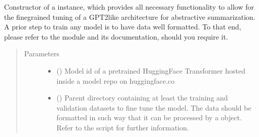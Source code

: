 \documentclass[letterpaper,10pt,english]{sphinxmanual}
\begin{document}
\begin{fulllineitems}
\begin{fulllineitems}
\label{\detokenize{code:gpt2_summarizer_train.TrainGPT2Summarizer.__init__}}
\sphinxAtStartPar
Constructor of a  instance, which provides all necessary functionality
to allow for the fine\sphinxhyphen{}grained tuning of a GPT2\sphinxhyphen{}like architecture for abstractive summarization.
A prior step to train any model is to have data well formatted. To that end, please refer to
the  module and its documentation, should you require it.
\begin{quote}\begin{description}
\item[{Parameters}] \leavevmode\begin{itemize}
\item {} 
\sphinxAtStartPar
{} () \textendash{} Model id of a pretrained HuggingFace Transformer hosted inside a model repo on
huggingface.co

\item {} 
\sphinxAtStartPar
{} (\sphinxstyleliteralemphasis{\sphinxupquote{{[}}}\sphinxstyleliteralemphasis{\sphinxupquote{, }}\sphinxstyleliteralemphasis{\sphinxupquote{{]}}}) \textendash{} Parent directory containing at least the training and validation datasets to fine
tune the model. The data should be formatted in such way that it can be processed
by a  object. Refer to the  script for further
information.


\end{itemize}
\end{description}
\end{quote}
\end{fulllineitems}
\end{fulllineitems}
\end{document}
